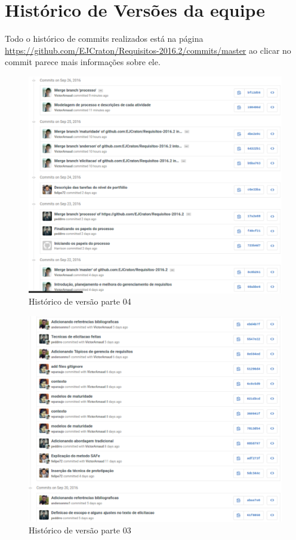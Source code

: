 \chapter{Histórico de Versões da equipe}

  Todo o histórico de commits realizados está na página \url{https://github.com/EJCraton/Requisitos-2016.2/commits/master}
  ao clicar no commit parece mais informações sobre ele.




  \begin{figure}[!htb]
    \centering
    \includegraphics[width=15cm, keepaspectratio=true]{figuras/historico/log4.eps}
    \caption{Histórico de versão parte 04}
  \end{figure}

  \begin{figure}[!htb]
    \centering
    \includegraphics[width=15cm, keepaspectratio=true]{figuras/historico/log3.eps}
    \caption{Histórico de versão parte 03}
  \end{figure}

